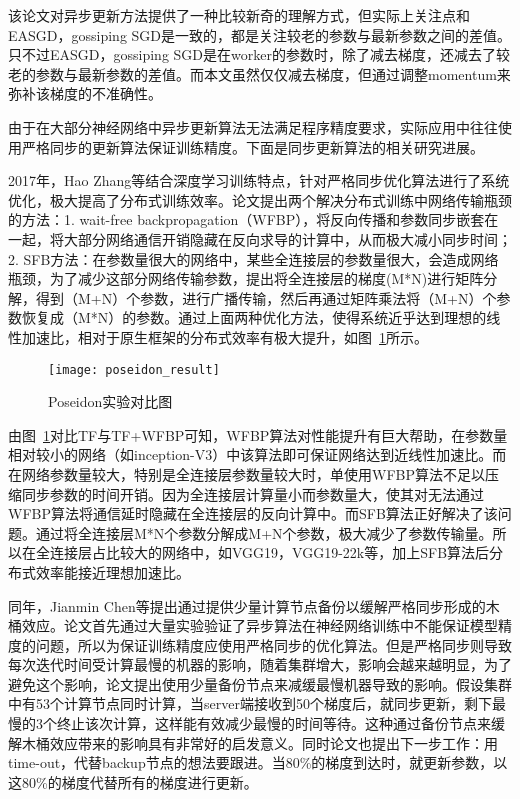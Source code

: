 该论文对异步更新方法提供了一种比较新奇的理解方式，但实际上关注点和EASGD，gossiping SGD是一致的，都是关注较老的参数与最新参数之间的差值。只不过EASGD，gossiping SGD是在worker的参数时，除了减去梯度，还减去了较老的参数与最新参数的差值。而本文虽然仅仅减去梯度，但通过调整momentum来弥补该梯度的不准确性。

由于在大部分神经网络中异步更新算法无法满足程序精度要求，实际应用中往往使用严格同步的更新算法保证训练精度。下面是同步更新算法的相关研究进展。

2017年，Hao Zhang等结合深度学习训练特点，针对严格同步优化算法进行了系统优化，极大提高了分布式训练效率。论文提出两个解决分布式训练中网络传输瓶颈的方法：1. wait-free backpropagation（WFBP），将反向传播和参数同步嵌套在一起，将大部分网络通信开销隐藏在反向求导的计算中，从而极大减小同步时间；2. SFB方法：在参数量很大的网络中，某些全连接层的参数量很大，会造成网络瓶颈，为了减少这部分网络传输参数，提出将全连接层的梯度(M*N)进行矩阵分解，得到（M+N）个参数，进行广播传输，然后再通过矩阵乘法将（M+N）个参数恢复成（M*N）的参数。通过上面两种优化方法，使得系统近乎达到理想的线性加速比，相对于原生框架的分布式效率有极大提升，如图~\ref{fig:poseidon_result}所示。

\begin{figure}[htp]
\centering
\texttt{[image: poseidon\_result]}
\caption{Poseidon实验对比图}
\label{fig:poseidon_result}
\end{figure}
由图~\ref{fig:poseidon_result}对比TF与TF+WFBP可知，WFBP算法对性能提升有巨大帮助，在参数量相对较小的网络（如inception-V3）中该算法即可保证网络达到近线性加速比。而在网络参数量较大，特别是全连接层参数量较大时，单使用WFBP算法不足以压缩同步参数的时间开销。因为全连接层计算量小而参数量大，使其对无法通过WFBP算法将通信延时隐藏在全连接层的反向计算中。而SFB算法正好解决了该问题。通过将全连接层M*N个参数分解成M+N个参数，极大减少了参数传输量。所以在全连接层占比较大的网络中，如VGG19，VGG19-22k等，加上SFB算法后分布式效率能接近理想加速比。

同年，Jianmin Chen等提出通过提供少量计算节点备份以缓解严格同步形成的木桶效应。论文首先通过大量实验验证了异步算法在神经网络训练中不能保证模型精度的问题，所以为保证训练精度应使用严格同步的优化算法。但是严格同步则导致每次迭代时间受计算最慢的机器的影响，随着集群增大，影响会越来越明显，为了避免这个影响，论文提出使用少量备份节点来减缓最慢机器导致的影响。假设集群中有53个计算节点同时计算，当server端接收到50个梯度后，就同步更新，剩下最慢的3个终止该次计算，这样能有效减少最慢的时间等待。这种通过备份节点来缓解木桶效应带来的影响具有非常好的启发意义。同时论文也提出下一步工作：用time-out，代替backup节点的想法要跟进。当80\%的梯度到达时，就更新参数，以这80\%的梯度代替所有的梯度进行更新。

